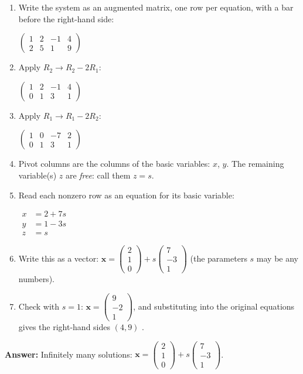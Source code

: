 \documentclass[11pt]{article}
\begin{document}
\begin{tcolorbox}[breakable,colback=ans,colframe=ansb,boxrule=0.5pt,left=4pt,right=4pt,top=2pt,bottom=2pt]\begin{enumerate}[leftmargin=2.2em,itemsep=1pt,topsep=1pt,label=\textbf{Step \arabic*.}]\item Write the system as an augmented matrix, one row per equation, with a bar before the right-hand side:\par\smallskip $\displaystyle \left(\begin{array}{ccc|c}1 & 2 & -1 & 4 \\ 2 & 5 & 1 & 9\end{array}\right)$
\item Apply $R_2\to R_2-2R_1$:\par\smallskip $\displaystyle \left(\begin{array}{ccc|c}1 & 2 & -1 & 4 \\ 0 & 1 & 3 & 1\end{array}\right)$
\item Apply $R_1\to R_1-2R_2$:\par\smallskip $\displaystyle \left(\begin{array}{ccc|c}1 & 0 & -7 & 2 \\ 0 & 1 & 3 & 1\end{array}\right)$
\item Pivot columns are the columns of the basic variables: $x$, $y$. The remaining variable(s) $z$ are \emph{free}: call them $z=s$.
\item Read each nonzero row as an equation for its basic variable:\par\smallskip $\displaystyle\begin{aligned}x&=2+7s\\ y&=1-3s\\ z&=s\end{aligned}$
\item Write this as a vector: $\displaystyle \mathbf x=\begin{pmatrix}2\\1\\0\end{pmatrix}+s\begin{pmatrix}7\\-3\\1\end{pmatrix}$ (the parameters $s$ may be any numbers).
\item Check with $s=1$: $\mathbf x=\begin{pmatrix}9\\-2\\1\end{pmatrix}$, and substituting into the original equations gives the right-hand sides $(4,9)$ \checkmark.
\end{enumerate}\textbf{Answer:} Infinitely many solutions: $\mathbf x=\begin{pmatrix}2\\1\\0\end{pmatrix}+s\begin{pmatrix}7\\-3\\1\end{pmatrix}$.\end{tcolorbox}
\end{document}
